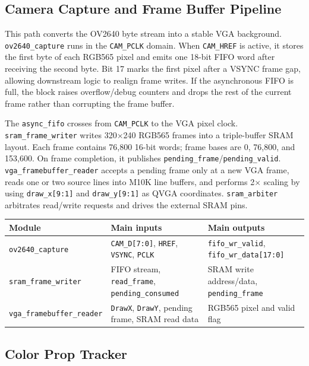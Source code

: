\documentclass[10pt]{article}
\begin{document}
\subsection{Camera Capture and Frame Buffer Pipeline}

This path converts the OV2640 byte stream into a stable VGA background. \texttt{ov2640\_capture} runs in the \texttt{CAM\_PCLK} domain. When \texttt{CAM\_HREF} is active, it stores the first byte of each RGB565 pixel and emits one 18-bit FIFO word after receiving the second byte. Bit 17 marks the first pixel after a VSYNC frame gap, allowing downstream logic to realign frame writes. If the asynchronous FIFO is full, the block raises overflow/debug counters and drops the rest of the current frame rather than corrupting the frame buffer.

The \texttt{async\_fifo} crosses from \texttt{CAM\_PCLK} to the VGA pixel clock. \texttt{sram\_frame\_writer} writes 320$\times$240 RGB565 frames into a triple-buffer SRAM layout. Each frame contains 76,800 16-bit words; frame bases are 0, 76,800, and 153,600. On frame completion, it publishes \texttt{pending\_frame}/\texttt{pending\_valid}. \texttt{vga\_framebuffer\_reader} accepts a pending frame only at a new VGA frame, reads one or two source lines into M10K line buffers, and performs 2$\times$ scaling by using \texttt{draw\_x[9:1]} and \texttt{draw\_y[9:1]} as QVGA coordinates. \texttt{sram\_arbiter} arbitrates read/write requests and drives the external SRAM pins.

\begin{center}
\small
\begin{tabular}{lll}
\toprule
Module & Main inputs & Main outputs \\
\midrule
\texttt{ov2640\_capture} & \texttt{CAM\_D[7:0]}, \texttt{HREF}, \texttt{VSYNC}, \texttt{PCLK} & \texttt{fifo\_wr\_valid}, \texttt{fifo\_wr\_data[17:0]} \\
\texttt{sram\_frame\_writer} & FIFO stream, \texttt{read\_frame}, \texttt{pending\_consumed} & SRAM write address/data, \texttt{pending\_frame} \\
\texttt{vga\_framebuffer\_reader} & \texttt{DrawX}, \texttt{DrawY}, pending frame, SRAM read data & RGB565 pixel and valid flag \\
\bottomrule
\end{tabular}
\end{center}

\subsection{Color Prop Tracker}
\end{document}
